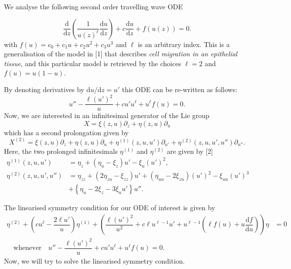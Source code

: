 We analyse the following second order travelling wave ODE 

$$\dfrac{\mathrm{d}}{\mathrm{d}z}\left(\dfrac{1}{u(z)^\ell}\dfrac{\mathrm{d}u}{\mathrm{d}z}\right)+c\dfrac{\mathrm{d}u}{\mathrm{d}z}+f(u(z))=0.$$
with $f(u)=c_0+c_1 u+c_2 u^2+c_3 u^3$ and $\ell$ is an arbitrary index. This is a generalisation of the model in [1] that describes \textit{cell migration in an epithelial tissue}, and this particular model is retrieved by the choices $\ell=2$ and $f(u)=u(1-u)$. 


By denoting derivatives by $\mathrm{d}u/\mathrm{d}z=u'$ this ODE can be re-written as follows:
\begin{equation}
    u''-\dfrac{\ell(u')^2}{u}+cu'u^\ell+u^\ell f(u)=0.
\end{equation}
Now, we are interested in an infinitesimal generator of the Lie group
$$X=\xi(z,u)\partial_z+\eta(z,u)\partial_u$$
which has a second prolongation given by
$$X^{(2)}=\xi(z,u)\partial_z+\eta(z,u)\partial_u+\eta^{(1)}(z,u,u')\partial_{u'}+\eta^{(2)}(z,u,u',u'')\partial_{u''}.$$
Here, the two prolonged infinitesimals $\eta^{(1)}$ and $\eta^{(2)}$ are given by [2]
\begin{align}
    \eta^{(1)}(z,u,u')&=\eta_z+(\eta_u-\xi_z)u'-\xi_u\left(u'\right)^2,\\
    \eta^{(2)}(z,u,u',u'')&=\eta_{zz}+(2\eta_{zu}-\xi_{zz})u'+\left(\eta_{uu}-2\xi_{zu}\right)\left(u'\right)^2-\xi_{uu}\left(u'\right)^3\nonumber\\
    &+\left\{\eta_u - 2\xi_z -3\xi_u u'\right\}u''.    
\end{align}

The linearised symmetry condition for our ODE of interest is given by
\begin{equation}
\begin{split}
    \eta^{(2)}+\left(cu^{\ell}-\dfrac{2\ell u'}{u}\right)\eta^{(1)}+\left(\dfrac{\ell (u')^2}{u^2}+c\ell u^{\ell-1}u'+u^{\ell-1}\left(\ell f(u)+u\dfrac{\mathrm{d}f}{\mathrm{d}u}\right)\right)\eta&=0\\
    \quad\mathrm{whenever}\quad u''-\dfrac{\ell(u')^2}{u}+cu'u^\ell+u^\ell f(u)=0.
\end{split}
    \label{eq:lin_sym}
  \end{equation}
  Now, we will try to solve the linearised symmetry condition.
